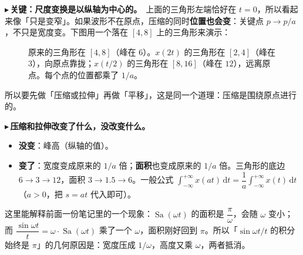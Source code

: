 \documentclass[UTF8,a4paper,11pt]{ctexart}
\newcommand{\Sa}{\operatorname{Sa}}
\renewcommand{\d}{\,\mathrm{d}}
\newcounter{ex}[section]
\newcommand{\point}[1]{\par\addvspace{1ex}\noindent\textcolor{ptteal}{$\blacktriangleright$\,\textbf{#1}}\ }
\renewcommand{\paragraph}[1]{\point{#1}}
\begin{document}
\paragraph{关键：尺度变换是以纵轴为中心的。}上面的三角形左端恰好在 $t=0$，所以看起来像「只是变窄」。如果波形不在原点，压缩的同时\textbf{位置也会变}：关键点 $p\to p/a$，不只是宽度变。下图用一个落在 $[4,8]$ 上的三角形来演示：

\begin{figure}[H]
\centering
{}
\caption{原来的三角形在 $[4,8]$（峰在 $6$）。$x(2t)$ 的三角形在 $[2,4]$（峰在 $3$），向原点靠拢；$x(t/2)$ 的三角形在 $[8,16]$（峰在 $12$），远离原点。每个点的位置都乘了 $1/a$。}
\end{figure}
所以要先做「压缩或拉伸」再做「平移」，这是同一个道理：压缩是围绕原点进行的。

\paragraph{压缩和拉伸改变了什么，没改变什么。}
\begin{itemize}[nosep]
\item \textbf{没变}：峰高（纵轴的值）。
\item \textbf{变了}：宽度变成原来的 $1/a$ 倍；\textbf{面积}也变成原来的 $1/a$ 倍。三角形的底边 $6\to3\to12$，面积 $3\to1.5\to6$。一般公式 $\int_{-\infty}^{+\infty}x(at)\d t=\dfrac{1}{a}\int_{-\infty}^{+\infty}x(t)\d t$（$a>0$，把 $s=at$ 代入即可）。
\end{itemize}
这里能解释前面一份笔记里的一个现象：$\Sa(\omega t)$ 的面积是 $\dfrac{\pi}{\omega}$，会随 $\omega$ 变小；而 $\dfrac{\sin\omega t}{t}=\omega\cdot\Sa(\omega t)$ 乘了一个 $\omega$，面积刚好回到 $\pi$。所以「$\sin\omega t/t$ 的积分始终是 $\pi$」的几何原因是：宽度压成 $1/\omega$，高度又乘 $\omega$，两者抵消。
\end{document}
